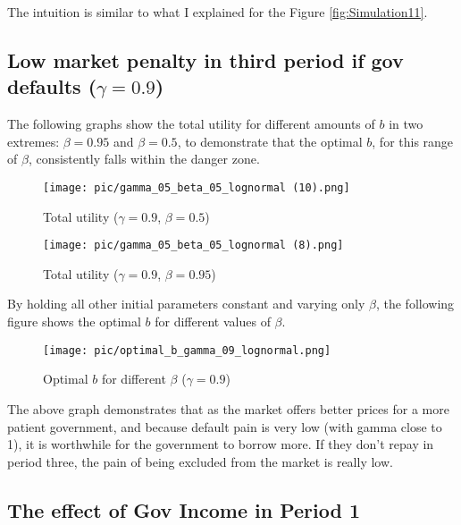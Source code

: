 \documentclass{article}
\begin{document}
The intuition is similar to what I explained for the Figure \ref{fig:Simulation11}.



\subsection{Low market penalty in third period if gov defaults ($\gamma = 0.9$)}

The following graphs show the total utility for different amounts of $b$ in two extremes: $\beta = 0.95$ and $\beta = 0.5$, to demonstrate that the optimal $b$, for this range of $\beta$, consistently falls within the danger zone.

\begin{figure}[H]
    \centering
    \begin{minipage}{0.5\textwidth}
        \centering
        \texttt{[image: pic/gamma\_05\_beta\_05\_lognormal (10).png]}
        \caption{Total utility ($\gamma = 0.9$, $\beta = 0.5$)}
        \label{fig:gamma05beta05}
    \end{minipage}\hfill
    \begin{minipage}{0.5\textwidth}
        \centering
        \texttt{[image: pic/gamma\_05\_beta\_05\_lognormal (8).png]}
        \caption{Total utility ($\gamma = 0.9$, $\beta = 0.95$)}
        \label{fig:gamma05beta095}
    \end{minipage}
\end{figure}

By holding all other initial parameters constant and varying only $\beta$, the following figure shows the optimal $b$ for 
different values of $\beta$.

\begin{figure}[H]
\centering
{\texttt{[image: pic/optimal\_b\_gamma\_09\_lognormal.png]}}
\caption{Optimal $b$ for different $\beta$ ($\gamma = 0.9$)}
\end{figure}

The above graph demonstrates that as the market offers better prices for a more patient government, and because default pain is very low (with gamma close to 1), it is worthwhile for the government to borrow more. If they don't repay in period three, the pain of being excluded from the market is really low.

\subsection{The effect of Gov Income in Period 1}
\end{document}
